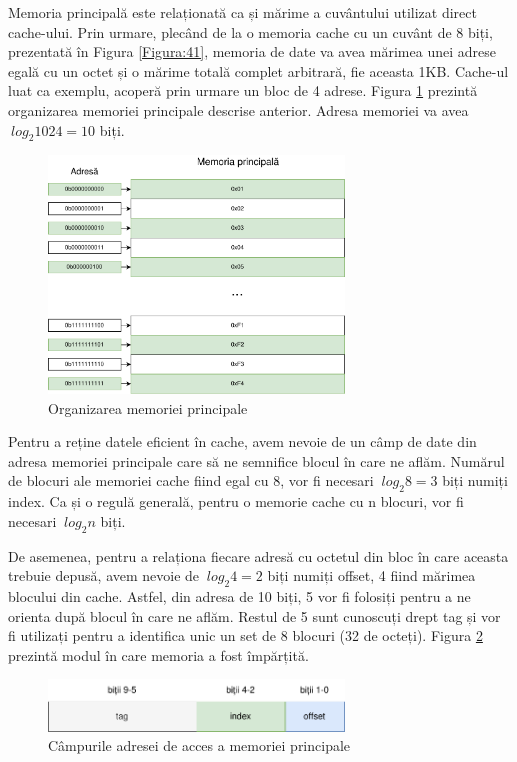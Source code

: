 \documentclass[12pt]{article}
\begin{document}
Memoria principală este relaționată ca și mărime a cuvântului utilizat direct cache-ului. Prin urmare, plecând de la o memoria cache cu un cuvânt de 8 biți, prezentată în Figura \ref{Figura:41}, memoria de date va avea mărimea unei adrese egală cu un octet și o mărime totală complet arbitrară, fie aceasta 1KB. Cache-ul luat ca exemplu, acoperă prin urmare un bloc de 4 adrese. Figura \ref{Figura:42} prezintă organizarea memoriei principale descrise anterior. Adresa  memoriei va avea  $\  log_2 1024 = 10$ biți.

 \begin{figure}[h!]
 \includegraphics[width=0.7\textwidth]{mainmem2.pdf}
 \centering
 \caption{Organizarea memoriei principale}
 \label{Figura:42}
 \end{figure}
 
 
Pentru a reține datele eficient în cache, avem nevoie de un câmp de date din adresa memoriei principale care să ne semnifice blocul în care ne aflăm. Numărul de blocuri ale memoriei cache fiind egal cu 8, vor fi necesari $\  log_2 8 = 3 $ biți numiți index. Ca și o regulă generală, pentru o memorie cache cu n blocuri, vor fi necesari $\  log_2 n $ biți.

 De asemenea, pentru a relaționa fiecare adresă cu octetul din bloc în care aceasta trebuie depusă, avem nevoie de $\  log_2 4 = 2 $ biți numiți offset, 4 fiind mărimea blocului din cache. Astfel, din adresa de 10 biți, 5 vor fi folosiți pentru a ne orienta după blocul în care ne aflăm. Restul de 5 sunt cunoscuți drept tag și vor fi utilizați pentru a identifica unic un set de 8 blocuri (32 de octeți). Figura \ref{Figura:44} prezintă modul în care memoria a fost împărțită.

 \begin{figure}[h!]
 \includegraphics[width=0.7\textwidth]{memdivision.pdf}
 \centering
 \caption{Câmpurile adresei de acces a memoriei principale}
 \label{Figura:44}
 \end{figure}
 
\end{document}
